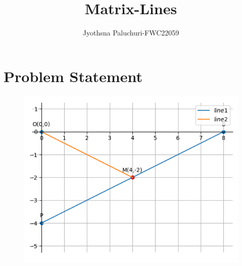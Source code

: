 \documentclass[journal,12pt,twocolumn]{IEEEtran}
\title{
Matrix-Lines
}
\author{Jyothsna Paluchuri-FWC22059\\}
\begin{document}
\maketitle
\tableofcontents
\bigskip
\section{Problem Statement}
\fi
	\begin{figure}[!ht]
		\centering
 \includegraphics[width=\columnwidth]{chapters/11/10/1/5/figs/line.png}
		\caption{}
		\label{fig:11/10/1/5}
  	\end{figure}
	\\
	\solution
\iffalse
\end{document}
